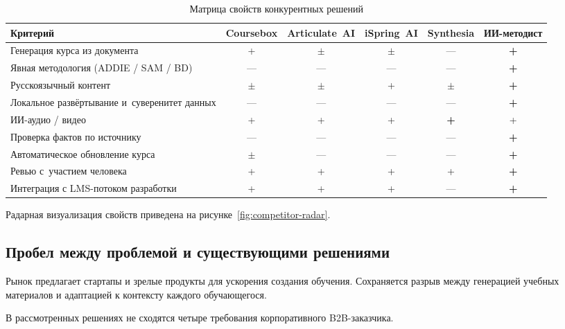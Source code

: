 \begin{table}[H]
  \caption{Матрица свойств конкурентных решений}
  \label{tab:competitors}
  \centering
  \small
  \begin{tabular}{|P{3.2cm}|c|c|c|c|c|}
  \hline
  \textbf{Критерий}
    & \textbf{Coursebox}
    & \textbf{Articulate~AI}
    & \textbf{iSpring~AI}
    & \textbf{Synthesia}
    & \textbf{ИИ-методист} \\
  \hline
  Генерация курса из документа
    & +
    & $\pm$
    & $\pm$
    & —
    & \textbf{+} \\
  \hline
  Явная методология (ADDIE / SAM / BD)
    & —
    & —
    & —
    & —
    & \textbf{+} \\
  \hline
  Русскоязычный контент
    & $\pm$
    & $\pm$
    & +
    & $\pm$
    & \textbf{+} \\
  \hline
  Локальное развёртывание и~суверенитет данных
    & —
    & —
    & —
    & —
    & \textbf{+} \\
  \hline
  ИИ-аудио / видео
    & +
    & +
    & +
    & \textbf{+}
    & + \\
  \hline
  Проверка фактов по источнику
    & —
    & —
    & —
    & —
    & \textbf{+} \\
  \hline
  Автоматическое обновление курса
    & $\pm$
    & —
    & —
    & —
    & \textbf{+} \\
  \hline
  Ревью с~участием человека
    & +
    & +
    & +
    & +
    & \textbf{+} \\
  \hline
  Интеграция с LMS-потоком разработки
    & +
    & +
    & +
    & —
    & \textbf{+} \\
  \hline
  \end{tabular}
\end{table}

Радарная визуализация свойств приведена на рисунке~\ref{fig:competitor-radar}.



\subsection{Пробел между проблемой и существующими решениями}

Рынок предлагает стартапы и зрелые продукты
для ускорения создания обучения. Сохраняется разрыв между генерацией учебных материалов и адаптацией к контексту каждого обучающегося.

В рассмотренных решениях не сходятся четыре требования корпоративного
B2B-заказчика.

